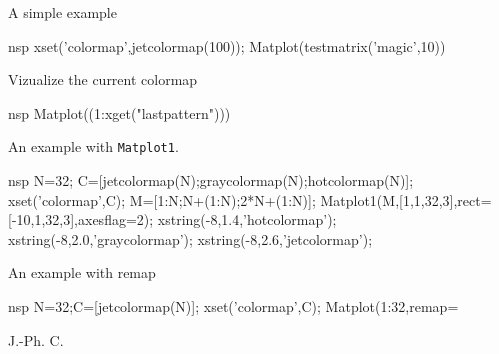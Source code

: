 \begin{examples}

\noindent A simple example

\begin{mintednsp}{nsp}
  xset('colormap',jetcolormap(100));
  Matplot(testmatrix('magic',10))
\end{mintednsp}

\noindent Vizualize the current colormap

\begin{mintednsp}{nsp}
  Matplot((1:xget("lastpattern")))
\end{mintednsp}

\noindent An example with \verb!Matplot1!.

\begin{mintednsp}{nsp}
  N=32;
  C=[jetcolormap(N);graycolormap(N);hotcolormap(N)];
  xset('colormap',C);
  M=[1:N;N+(1:N);2*N+(1:N)];
  Matplot1(M,[1,1,32,3],rect=[-10,1,32,3],axesflag=2);
  xstring(-8,1.4,'hotcolormap');
  xstring(-8,2.0,'graycolormap');
  xstring(-8,2.6,'jetcolormap');
\end{mintednsp}

\noindent An example with remap

\begin{mintednsp}{nsp}
  N=32;C=[jetcolormap(N)]; xset('colormap',C);
  Matplot(1:32,remap=%
\end{mintednsp}
\end{examples}
\begin{manseealso}
\end{manseealso}
\begin{authors}
  J.-Ph. C.
\end{authors}

